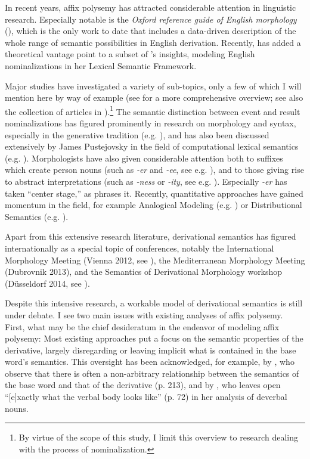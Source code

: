 In recent years, affix polysemy has attracted considerable attention in linguistic research. 
Especially notable is the \textit{Oxford reference guide of English morphology} (\citealt{Bauer.2013}), which is the only work to date that includes a data-driven description of the whole range of semantic possibilities in English derivation. Recently, \citet{Lieber.2016} has added a theoretical vantage point to a subset of \citeauthor{Bauer.2013}'s insights, modeling English nominalizations in her Lexical Semantic Framework. 


Major studies have investigated a variety of sub-topics, only a few of which I will mention here by way of example (see \citealt{Lieber.2016} for a more comprehensive overview; see also the collection of articles in \citealt{Bauer.2015}).\footnote{By virtue of the scope of this study, I limit this overview to research dealing with the process of nominalization.} 
The semantic distinction between event and result nominalizations has figured prominently in research on morphology and syntax, especially in the generative tradition (e.g. \citealt{Alexiadou.2001,Borer.2013,Grimshaw.1990,Melloni.2007,Melloni.2011,Fradin.2011}), and has also been discussed extensively by James Pustejovsky in the field of computational lexical semantics (e.g. \citeyear{Pustejovsky.1995,Pustejovsky.1998}). 
Morphologists have also given considerable attention both to suffixes which create person nouns (such as \textit{-er} and \textit{-ee}, see e.g. \citealt{Lieber.2004,Booij.2004}), and to those giving rise to abstract interpretations (such as \textit{-ness} or \textit{-ity}, see e.g. \citealt{Trips.2009,Arndt-Lappe.2014}). Especially \textit{-er} has taken ``center stage,'' as \citet{Rainer.2014poly} phrases it.
Recently, quantitative approaches have gained momentum in the field, for example Analogical Modeling (e.g. \citealt{Arndt-Lappe.2014}) or Distributional Semantics (e.g. \citealt{Lapesa.2018,Wauquier.2020}).


Apart from this extensive research literature, derivational semantics has figured internationally as a special topic of conferences, notably the
International Morphology Meeting (Vienna 2012, see \citealt{Rainer.2014coll}), the Mediterranean Morphology Meeting (Dubrovnik 2013), and the Semantics of Derivational Morphology workshop (Düsseldorf 2014, see \citealt{Arndt-Lappe.2015}).

 Despite this intensive research, a workable model of derivational semantics is still under debate.
I see two main issues with existing analyses of affix polysemy.
First, what may be the chief desideratum in the endeavor of modeling affix polysemy: Most existing approaches put a focus on the semantic properties of the derivative, largely disregarding or leaving implicit what is contained in the base word's semantics.
This oversight has been acknowledged, for example, by \citet{Bauer.2013}, who observe that there is often a non-arbitrary relationship between the semantics of the base word and that of the derivative (p. 213), and by \citet[]{Lieber.2004}, who leaves open ``[e]xactly what the verbal body looks like'' (p. 72) in her analysis of deverbal nouns. 


